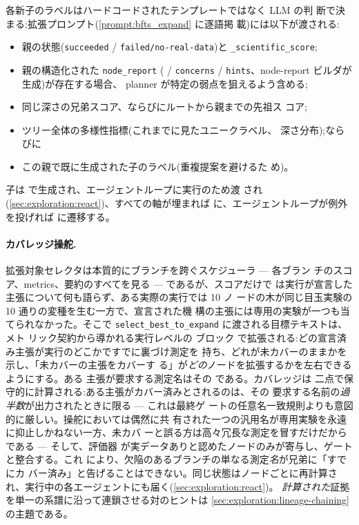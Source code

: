各新子のラベルはハードコードされたテンプレートではなく LLM の判
断で決まる;拡張プロンプト(\cref{prompt:bfts_expand} に逐語掲
載)には以下が渡される:

\begin{itemize}
  \item 親の状態(\texttt{succeeded} /
        \texttt{failed/no-real-data})と
        \texttt{\_scientific\_score};
  \item 親の構造化された \texttt{node\_report}
        ( / \texttt{concerns} /
        \texttt{hints}、node-report ビルダが生成)が存在する場合、
        planner が特定の弱点を狙えるよう含める;
  \item 同じ深さの兄弟スコア、ならびにルートから親までの先祖ス
        コア;
  \item ツリー全体の多様性指標(これまでに見たユニークラベル、
        深さ分布);ならびに
  \item この親で既に生成された子のラベル(重複提案を避けるた
        め)。
\end{itemize}

子は \StateOpen{} で生成され、エージェントループに実行のため渡
され(\cref{sec:exploration:react})、すべての軸が埋まれば
\StateDone{} に、エージェントループが例外を投げれば
\StateFailed{} に遷移する。

\paragraph{カバレッジ操舵.}
拡張対象セレクタは本質的にブランチを跨ぐスケジューラ — 各ブラン
チのスコア、metrics、要約のすべてを見る — であるが、スコアだけで
は実行が宣言した主張について何も語らず、ある実際の実行では 10 ノ
ードの木が同じ目玉実験の 10 通りの変種を生む一方で、宣言された機
構の主張には専用の実験が一つも当てられなかった。そこで
\texttt{select\_best\_to\_expand} に渡される目標テキストは、メト
リック契約から導かれる実行レベルの ブロック
で拡張される:どの宣言済み主張が実行のどこかですでに裏づけ測定を
持ち、どれが未カバーのままかを示し、「未カバーの主張をカバーす
る」が\emph{どの}ノードを拡張するかを左右できるようにする。ある
主張が要求する測定名はその である。カバレッジは
二点で保守的に計算される:ある主張がカバー済みとされるのは、その
要求する名前の\emph{過半数}が出力されたときに限る — これは最終ゲ
ートの任意名一致規則よりも意図的に厳しい。操舵においては偶然に共
有された一つの汎用名が専用実験を永遠に抑止しかねない一方、未カバ
ーと誤る方は高々冗長な測定を冒すだけだからである — そして、評価器
が実データありと認めたノードのみが寄与し、ゲートと整合する。これ
により、欠陥のあるブランチの単なる測定\emph{名}が兄弟に「すでにカ
バー済み」と告げることはできない。同じ状態はノードごとに再計算さ
れ、実行中の各エージェントにも届く(\cref{sec:exploration:react})。
\emph{計算された}証拠を単一の系譜に沿って連鎖させる対のヒントは
\cref{sec:exploration:lineage-chaining} の主題である。

